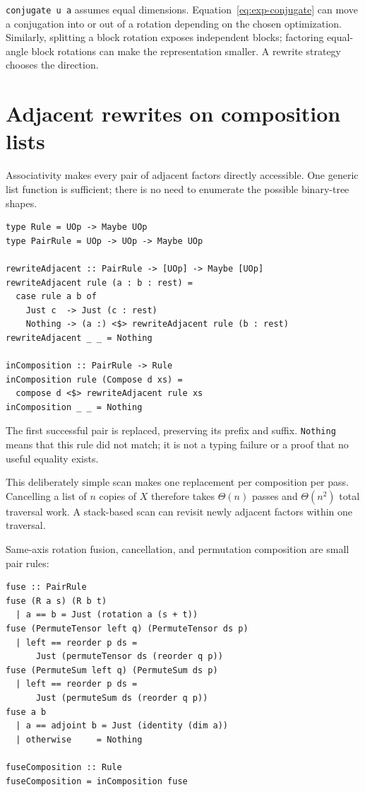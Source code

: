 \documentclass[11pt,a4paper]{article}
\newcommand{\code}[1]{\texttt{#1}}
\begin{document}
\code{conjugate u a} assumes equal dimensions. Equation~\eqref{eq:exp-conjugate}
can move a conjugation into or out of a rotation depending on the
chosen optimization. Similarly, splitting a block rotation exposes
independent blocks; factoring equal-angle block rotations can make
the representation smaller. A rewrite strategy chooses the direction.

\section{Adjacent rewrites on composition lists}

Associativity makes every pair of adjacent factors directly accessible.
One generic list function is sufficient; there is no need to enumerate
the possible binary-tree shapes.

\begin{lstlisting}
type Rule = UOp -> Maybe UOp
type PairRule = UOp -> UOp -> Maybe UOp

rewriteAdjacent :: PairRule -> [UOp] -> Maybe [UOp]
rewriteAdjacent rule (a : b : rest) =
  case rule a b of
    Just c  -> Just (c : rest)
    Nothing -> (a :) <$> rewriteAdjacent rule (b : rest)
rewriteAdjacent _ _ = Nothing

inComposition :: PairRule -> Rule
inComposition rule (Compose d xs) =
  compose d <$> rewriteAdjacent rule xs
inComposition _ _ = Nothing
\end{lstlisting}

The first successful pair is replaced, preserving its prefix and
suffix. \code{Nothing} means that this rule did not match; it is not a
typing failure or a proof that no useful equality exists.

This deliberately simple scan makes one replacement per composition
per pass. Cancelling a list of $n$ copies of $X$ therefore takes
$\Theta(n)$ passes and $\Theta(n^2)$ total traversal work. A stack-based
scan can revisit newly adjacent factors within one traversal.

Same-axis rotation fusion, cancellation, and permutation composition
are small pair rules:

\begin{lstlisting}
fuse :: PairRule
fuse (R a s) (R b t)
  | a == b = Just (rotation a (s + t))
fuse (PermuteTensor left q) (PermuteTensor ds p)
  | left == reorder p ds =
      Just (permuteTensor ds (reorder q p))
fuse (PermuteSum left q) (PermuteSum ds p)
  | left == reorder p ds =
      Just (permuteSum ds (reorder q p))
fuse a b
  | a == adjoint b = Just (identity (dim a))
  | otherwise     = Nothing

fuseComposition :: Rule
fuseComposition = inComposition fuse
\end{lstlisting}
\end{document}
